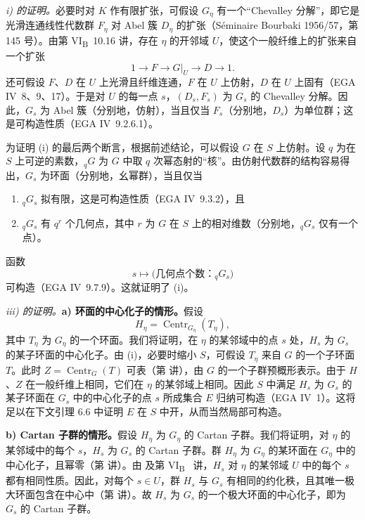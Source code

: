 \emph{i) 的证明。}必要时对 \(K\) 作有限扩张，可假设 \(G_{\eta}\) 有一个“Chevalley 分解”，即它是光滑连通线性代数群 \(F_{\eta}\) 对 Abel 簇 \(D_{\eta}\) 的扩张（Séminaire Bourbaki 1956/57，第 145 号）。由第 VI\textsubscript{B}~10.16 讲，存在 \(\eta\) 的开邻域 \(U\)，使这个一般纤维上的扩张来自一个扩张
\[
  1\longrightarrow F\longrightarrow G|_U\longrightarrow D
  \longrightarrow 1.
\]
还可假设 \(F\)、\(D\) 在 \(U\) 上光滑且纤维连通，\(F\) 在 \(U\) 上仿射，\(D\) 在 \(U\) 上固有（EGA IV~8、9、17）。于是对 \(U\) 的每一点 \(s\)，\((D_s,F_s)\) 为 \(G_s\) 的 Chevalley 分解。因此，\(G_s\) 为 Abel 簇（分别地，仿射），当且仅当 \(F_s\)（分别地，\(D_s\)）为单位群；这是可构造性质（EGA IV~9.2.6.1）。

为证明 (i) 的最后两个断言，根据前述结论，可以假设 \(G\) 在 \(S\) 上仿射。设 \(q\) 为在 \(S\) 上可逆的素数，\({}_qG\) 为 \(G\) 中取 \(q\) 次幂态射的“核”。由仿射代数群的结构容易得出，\(G_s\) 为环面（分别地，幺幂群），当且仅当
\begin{enumerate}
\renewcommand{\labelenumi}{\textup{\alph{enumi})}}
\item \({}_qG_s\) 拟有限，这是可构造性质（EGA IV~9.3.2），且
\item \({}_qG_s\) 有 \(q^r\) 个几何点，其中 \(r\) 为 \(G\) 在 \(S\) 上的相对维数（分别地，\({}_qG_s\) 仅有一个点）。
\end{enumerate}
函数
\[
 s\longmapsto
 \bigl(\text{几何点个数：}{}_qG_s\bigr)
\]
可构造（EGA IV~9.7.9）。这就证明了 (i)。

\emph{iii) 的证明。}\textbf{a) 环面的中心化子的情形。}假设
\[
  H_{\eta}=\operatorname{Centr}_{G_{\eta}}(T_{\eta}),
\]
其中 \(T_{\eta}\) 为 \(G_{\eta}\) 的一个环面。我们将证明，在 \(\eta\) 的某邻域中的点 \(s\) 处，\(H_s\) 为 \(G_s\) 的某子环面的中心化子。由 (i)，必要时缩小 \(S\)，可假设 \(T_{\eta}\) 来自 \(G\) 的一个子环面 \(T\)。此时 \(Z=\operatorname{Centr}_{G}(T)\) 可表（第  讲），由 \(G\) 的一个子群预概形表示。由于 \(H\)、\(Z\) 在一般纤维上相同，它们在 \(\eta\) 的某邻域上相同。因此 \(S\) 中满足 \(H_s\) 为 \(G_s\) 的某子环面在 \(G_s\) 中的中心化子的点 \(s\) 所成集合 \(E\) 归纳可构造（EGA IV~1）。这将足以在下文引理 6.6 中证明 \(E\) 在 \(S\) 中开，从而当然局部可构造。

\textbf{b) Cartan 子群的情形。}假设 \(H_{\eta}\) 为 \(G_{\eta}\) 的 Cartan 子群。我们将证明，对 \(\eta\) 的某邻域中的每个 \(s\)，\(H_s\) 为 \(G_s\) 的 Cartan 子群。群 \(H_{\eta}\) 为 \(G_{\eta}\) 的某环面在 \(G_{\eta}\) 中的中心化子，且幂零（第  讲）。由  及第 VI\textsubscript{B}~ 讲，\(H_s\) 对 \(\eta\) 的某邻域 \(U\) 中的每个 \(s\) 都有相同性质。因此，对每个 \(s\in U\)，群 \(H_s\) 与 \(G_s\) 有相同的约化秩，且其唯一极大环面包含在中心中（第  讲）。故 \(H_s\) 为 \(G_s\) 的一个极大环面的中心化子，即为 \(G_s\) 的 Cartan 子群。

